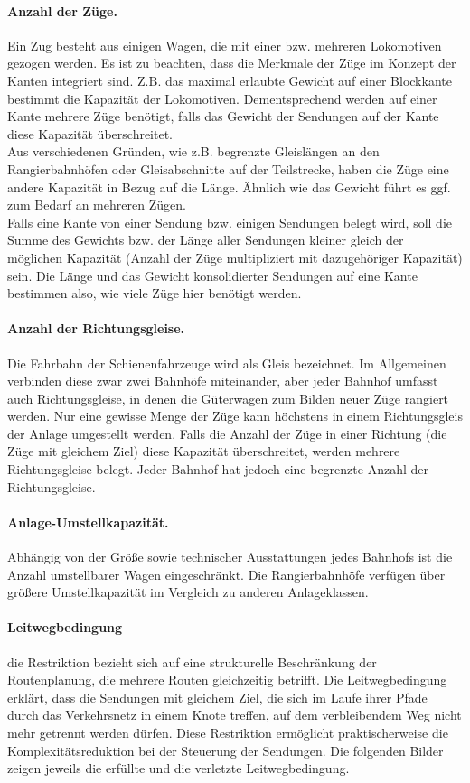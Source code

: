 \paragraph{Anzahl der Züge.}
Ein Zug besteht aus einigen Wagen, die mit einer bzw. mehreren Lokomotiven gezogen werden. Es ist zu beachten, dass die Merkmale der Züge im Konzept der Kanten integriert sind. Z.B. das maximal erlaubte Gewicht auf einer Blockkante bestimmt die Kapazität der Lokomotiven. Dementsprechend werden auf einer Kante mehrere Züge benötigt, falls das Gewicht der Sendungen auf der Kante diese Kapazität überschreitet.\\
Aus verschiedenen Gründen, wie z.B. begrenzte Gleislängen an den Rangierbahnhöfen oder Gleisabschnitte auf der Teilstrecke, haben die Züge eine andere Kapazität in Bezug auf die Länge. Ähnlich wie das Gewicht führt es ggf. zum Bedarf an mehreren Zügen.\\
Falls eine Kante von einer Sendung bzw. einigen Sendungen belegt wird, soll die Summe des Gewichts bzw. der Länge aller Sendungen kleiner gleich der möglichen Kapazität (Anzahl der Züge multipliziert mit dazugehöriger Kapazität) sein. Die Länge und das Gewicht konsolidierter Sendungen auf eine Kante bestimmen also, wie viele Züge hier benötigt werden.

\paragraph{Anzahl der Richtungsgleise.}
Die Fahrbahn der Schienenfahrzeuge wird als Gleis bezeichnet. Im Allgemeinen verbinden diese zwar zwei Bahnhöfe miteinander, aber jeder Bahnhof umfasst auch Richtungsgleise, in denen die Güterwagen zum Bilden neuer Züge rangiert werden. Nur eine gewisse Menge der Züge kann höchstens in einem Richtungsgleis der Anlage umgestellt werden. Falls die Anzahl der Züge in einer Richtung (die Züge mit gleichem Ziel) diese Kapazität überschreitet, werden mehrere Richtungsgleise belegt. Jeder Bahnhof hat jedoch eine begrenzte Anzahl der Richtungsgleise.

\paragraph{Anlage-Umstellkapazität.}
Abhängig von der Größe sowie technischer Ausstattungen jedes Bahnhofs ist  die Anzahl umstellbarer Wagen eingeschränkt. Die Rangierbahnhöfe verfügen über größere Umstellkapazität im Vergleich zu anderen Anlageklassen.

\paragraph{Leitwegbedingung}
die Restriktion bezieht sich auf eine strukturelle Beschränkung der Routenplanung, die mehrere Routen gleichzeitig betrifft. Die Leitwegbedingung erklärt, dass die Sendungen mit gleichem Ziel, die sich im Laufe ihrer Pfade durch das Verkehrsnetz in einem Knote treffen, auf dem verbleibendem Weg nicht mehr getrennt werden dürfen. Diese Restriktion ermöglicht praktischerweise die Komplexitätsreduktion bei der Steuerung der Sendungen. Die folgenden Bilder zeigen jeweils die erfüllte und die verletzte Leitwegbedingung.

